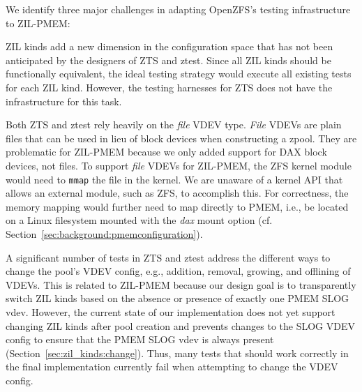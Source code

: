 \documentclass[12pt,a4paper,twoside]{book}
\begin{document}
We identify three major challenges in adapting OpenZFS's testing infrastructure to ZIL-PMEM:
\begin{description}[noitemsep]
    \item[Dimensionality] ZIL kinds add a new dimension in the configuration space that has not been anticipated by the designers of ZTS and ztest.
        Since all ZIL kinds should be functionally equivalent, the ideal testing strategy would execute all existing tests for each ZIL kind.
        However, the testing harnesses for ZTS does not have the infrastructure for this task.

    \item[File VDEVs] Both ZTS and ztest rely heavily on the \textit{file} VDEV type.
        \textit{File} VDEVs are plain files that can be used in lieu of block devices when constructing a zpool.
        They are problematic for ZIL-PMEM because we only added support for DAX block devices, not files.
        To support \textit{file} VDEVs for ZIL-PMEM, the ZFS kernel module would need to \lstinline{mmap} the file in the kernel.
        We are unaware of a kernel API that allows an external module, such as ZFS, to accomplish this.
        For correctness, the memory mapping would further need to map directly to PMEM, i.e., be located on a Linux filesystem mounted with the \textit{dax} mount option (cf. Section~\ref{sec:background:pmemconfiguration}).

    \item[VDEV Management]
        A significant number of tests in ZTS and ztest address the different ways to change the pool's VDEV config, e.g., addition, removal, growing, and offlining of VDEVs.
        This is related to ZIL-PMEM because our design goal is to transparently switch ZIL kinds based on the absence or presence of exactly one PMEM SLOG vdev.
        However, the current state of our implementation does not yet support changing ZIL kinds after pool creation and prevents changes to the SLOG VDEV config to ensure that the PMEM SLOG vdev is always present (Section~\ref{sec:zil_kinds:change}).
        Thus, many tests that should work correctly in the final implementation currently fail when attempting to change the VDEV config.
\end{description}
\end{document}
